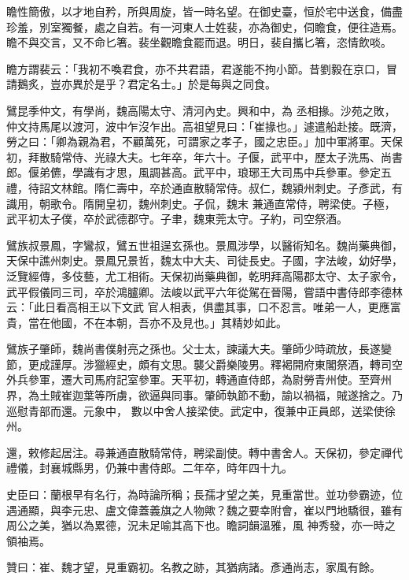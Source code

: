 \begin{pinyinscope}
 瞻性簡傲，以才地自矜，所與周旋，皆一時名望。在御史臺，恒於宅中送食，備盡珍羞，別室獨餐，處之自若。有一河東人士姓裴，亦為御史，伺瞻食，便往造焉。瞻不與交言，又不命匕箸。裴坐觀瞻食罷而退。明日，裴自攜匕箸，恣情飲啖。



 瞻方謂裴云：「我初不喚君食，亦不共君語，君遂能不拘小節。昔劉毅在京口，冒請鵝炙，豈亦異於是乎？君定名士。」於是每與之同食。



 鷿昆季仲文，有學尚，魏高陽太守、清河內史。興和中，為
 丞相掾。沙苑之敗，仲文持馬尾以渡河，波中乍沒乍出。高祖望見曰：「崔掾也。」遽遣船赴接。既濟，勞之曰：「卿為親為君，不顧萬死，可謂家之孝子，國之忠臣。」加中軍將軍。天保初，拜散騎常侍、光祿大夫。七年卒，年六十。子偃，武平中，歷太子洗馬、尚書郎。偃弟儦，學識有才思，風調甚高。武平中，琅琊王大司馬中兵參軍。參定五禮，待詔文林館。隋仁壽中，卒於通直散騎常侍。叔仁，魏潁州刺史。子彥武，有識用，朝歌令。隋開皇初，魏州刺史。子侃，魏末
 兼通直常侍，聘梁使。子極，武平初太子僕，卒於武德郡守。子聿，魏東莞太守。子約，司空祭酒。



 鷿族叔景鳳，字鸞叔，鷿五世祖逞玄孫也。景鳳涉學，以醫術知名。魏尚藥典御，天保中譙州刺史。景鳳兄景哲，魏太中大夫、司徒長史。子國，字法峻，幼好學，泛覽經傳，多伎藝，尤工相術。天保初尚藥典御，乾明拜高陽郡太守、太子家令，武平假儀同三司，卒於鴻臚卿。法峻以武平六年從駕在晉陽，嘗語中書侍郎李德林云：「此日看高相王以下文武
 官人相表，俱盡其事，口不忍言。唯弟一人，更應富貴，當在他國，不在本朝，吾亦不及見也。」其精妙如此。



 鷿族子肇師，魏尚書僕射亮之孫也。父士太，諫議大夫。肇師少時疏放，長遂變節，更成謹厚。涉獵經史，頗有文思。襲父爵樂陵男。釋褐開府東閣祭酒，轉司空外兵參軍，遷大司馬府記室參軍。天平初，轉通直侍郎，為尉勞青州使。至齊州界，為土賊崔迦葉等所虜，欲逼與同事。肇師執節不動，諭以禍福，賊遂捨之。乃巡慰青部而還。元象中，
 數以中舍人接梁使。武定中，復兼中正員郎，送梁使徐州。



 還，敕修起居注。尋兼通直散騎常侍，聘梁副使。轉中書舍人。天保初，參定禪代禮儀，封襄城縣男，仍兼中書侍郎。二年卒，時年四十九。



 史臣曰：蘭根早有名行，為時論所稱；長孺才望之美，見重當世。並功參霸迹，位遇通顯，與李元忠、盧文偉蓋義旗之人物歟？魏之要幸附會，崔以門地驕很，雖有周公之美，猶以為累德，況未足喻其高下也。瞻詞韻溫雅，風
 神秀發，亦一時之領袖焉。



 贊曰：崔、魏才望，見重霸初。名教之跡，其猶病諸。彥通尚志，家風有餘。



\end{pinyinscope}